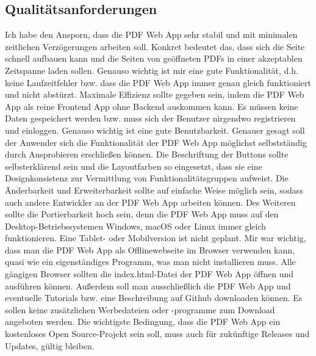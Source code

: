 \subsection{Qualitätsanforderungen}
Ich habe den Ansporn, dass die PDF Web App sehr stabil und mit minimalen zeitlichen Verzögerungen arbeiten soll. Konkret bedeutet das, dass sich die Seite schnell aufbauen kann und die Seiten von geöffneten PDFs in einer akzeptablen Zeitspanne laden sollen. Genauso wichtig ist mir eine gute Funktionalität, d.h. keine Laufzeitfehler bzw. dass die PDF Web App immer genau gleich funktioniert und nicht abstürzt. Maximale Effizienz sollte gegeben sein, indem die PDF Web App als reine Frontend App ohne Backend auskommen kann. Es müssen keine Daten gespeichert werden bzw. muss sich der Benutzer nirgendwo registrieren und einloggen. Genauso wichtig ist eine gute Benutzbarkeit. Genauer gesagt soll der Anwender sich die Funktionalität der PDF Web App möglichst selbstständig durch Ausprobieren erschließen können. Die Beschriftung der Buttons sollte selbsterklärend sein und die Layoutfarben so eingesetzt, dass sie eine Designkonsistenz zur Vermittlung von Funktionalitätsgruppen aufweist. Die Änderbarkeit und Erweiterbarkeit sollte auf einfache Weise möglich sein, sodass auch andere Entwickler an der PDF Web App arbeiten können. Des Weiteren sollte die Portierbarkeit hoch sein, denn die PDF Web App muss auf den Desktop-Betriebssystemen Windows, macOS oder Linux immer gleich funktionieren. Eine Tablet- oder Mobilversion ist nicht geplant. Mir war wichtig, dass man die PDF Web App als Offlinewebseite im Browser verwenden kann, quasi wie ein eigenständiges Programm, was man nicht installieren muss. Alle gängigen Browser sollten die index.html-Datei der PDF Web App öffnen und ausführen können. Außerdem soll man ausschließlich die PDF Web App und eventuelle Tutorials bzw. eine Beschreibung auf Github downloaden können. Es sollen keine zusätzlichen Werbedateien oder -programme zum Download angeboten werden. Die wichtigste Bedingung, dass die PDF Web App ein kostenloses Open Source-Projekt sein soll, muss auch für zukünftige Releases und Updates, gültig bleiben. 